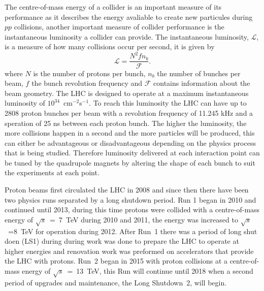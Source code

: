
The centre-of-mass energy of a collider is an important measure of its performance as it describes the energy avaliable to create new particules during $pp$ collisions, another important measure of collider performance is the instantaneous luminosity a collider can provide. The instantaneous luminosity, $\mathcal{L}$, is a measure of how many collisions occur per second, it is given by
\begin{equation}
\mathcal{L} = \frac{N^{2} f n_{b}}{\mathcal{F}}.
\label{eq:inst_lumi}
\end{equation}
where $N$ is the number of protons per bunch, $n_{b}$ the number of bunches per beam, $f$ the bunch revolution frequency and $\mathcal{F}$ contains information about the beam geometry. The LHC is designed to operate at a maximum instantaneous luminosity of $10^{34}$~cm$^{-2}$s$^{-1}$. To reach this luminosity the LHC can have up to 2808 proton bunches per beam with a revolution frequency of 11.245 kHz and a speration of 25 ns between each proton bunch. %
The higher the luminosity, the more collisions happen in a second and the more particles will be produced, this can either be advantageous or disadvantageous depending on the physics process that is being studied.
Therefore luminosity delivered at each interaction point can be tuned by the quadrupole magnets by altering the shape of each bunch to suit the experiments at each point.

Proton beams first circulated the LHC in 2008 and since then there have been two physics runs separated by a long shutdown period. Run 1 began in 2010 and continued until 2013, during this time protons were collided with a centre-of-mass energy of $\sqrt{s}$~=~7~TeV during 2010 and 2011, the energy was increased to $\sqrt{s}$~=8~TeV for operation during 2012. After Run~1 there was a period of long shut doen (LS1) during during work was done to prepare the LHC to operate at higher energies and renovation work was preformed on accelerators that provide the LHC with protons. Run~2 began in 2015 with proton collisions at a centre-of-mass energy of $\sqrt{s}$~=~13~TeV, %
this Run will continue until 2018 when a second period of upgrades and maintenance, the Long Shutdown~2, will begin.




